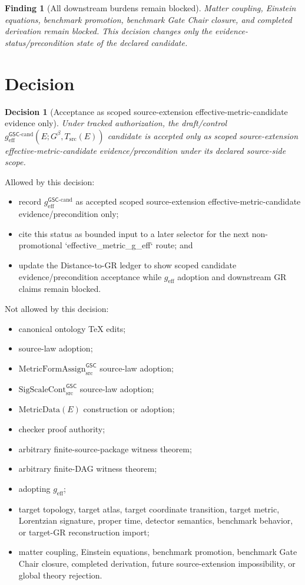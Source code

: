 \documentclass[11pt]{article}
\newcommand{\Gbeta}{G^\beta}
\newcommand{\SigScaleCont}{\mathrm{SigScaleCont}^{\mathsf{GSC}}_{\mathrm{src}}}
\newcommand{\MetricFormAssign}{\mathrm{MetricFormAssign}^{\mathsf{GSC}}_{\mathrm{src}}}
\newcommand{\geff}{g_{\mathrm{eff}}}
\newcommand{\geffCand}{g_{\mathrm{eff}}^{\mathsf{GSC}\mbox{-}\mathrm{cand}}}
\newtheorem{decision}{Decision}
\newtheorem{finding}{Finding}
\begin{document}
\begin{finding}[All downstream burdens remain blocked]
Matter coupling, Einstein equations, benchmark promotion, benchmark Gate Chair
closure, and completed derivation remain blocked. This decision changes only
the evidence-status/precondition state of the declared candidate.
\end{finding}

\section{Decision}

\begin{decision}[Acceptance as scoped source-extension effective-metric-candidate evidence only]
Under tracked authorization, the draft/control
\(\geffCand(E;\Gbeta,T_{\mathrm{src}}(E))\) candidate is accepted only as
scoped source-extension effective-metric-candidate evidence/precondition under
its declared source-side scope.
\end{decision}

Allowed by this decision:
\begin{itemize}[leftmargin=*]
  \item record \(\geffCand\) as accepted scoped source-extension
  effective-metric-candidate evidence/precondition only;
  \item cite this status as bounded input to a later selector for the next
  non-promotional `effective_metric_g_eff` route; and
  \item update the Distance-to-GR ledger to show scoped candidate
  evidence/precondition acceptance while \(\geff\) adoption and downstream GR
  claims remain blocked.
\end{itemize}

Not allowed by this decision:
\begin{itemize}[leftmargin=*]
  \item canonical ontology TeX edits;
  \item source-law adoption;
  \item \(\MetricFormAssign\) source-law adoption;
  \item \(\SigScaleCont\) source-law adoption;
  \item \(\mathrm{MetricData}(E)\) construction or adoption;
  \item checker proof authority;
  \item arbitrary finite-source-package witness theorem;
  \item arbitrary finite-DAG witness theorem;
  \item adopting \(\geff\);
  \item target topology, target atlas, target coordinate transition, target
  metric, Lorentzian signature, proper time, detector semantics, benchmark
  behavior, or target-GR reconstruction import;
  \item matter coupling, Einstein equations, benchmark promotion, benchmark
  Gate Chair closure, completed derivation, future source-extension
  impossibility, or global theory rejection.
\end{itemize}
\end{document}
